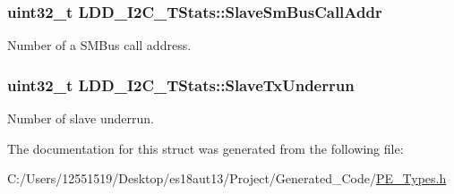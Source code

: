 \subsubsection[{Slave\+Sm\+Bus\+Call\+Addr}]{\setlength{\rightskip}{0pt plus 5cm}uint32\+\_\+t L\+D\+D\+\_\+\+I2\+C\+\_\+\+T\+Stats\+::\+Slave\+Sm\+Bus\+Call\+Addr}\label{struct_l_d_d___i2_c___t_stats_a134cb9fb9e37217e70e8a93924bca300}
Number of a S\+M\+Bus call address. \hypertarget{struct_l_d_d___i2_c___t_stats_add2f9914a1ea98c3bf86c0cab84e6a8c}{}
\subsubsection[{Slave\+Tx\+Underrun}]{\setlength{\rightskip}{0pt plus 5cm}uint32\+\_\+t L\+D\+D\+\_\+\+I2\+C\+\_\+\+T\+Stats\+::\+Slave\+Tx\+Underrun}\label{struct_l_d_d___i2_c___t_stats_add2f9914a1ea98c3bf86c0cab84e6a8c}
Number of slave underrun. 

The documentation for this struct was generated from the following file\+:\begin{DoxyCompactItemize}
\item 
C\+:/\+Users/12551519/\+Desktop/es18aut13/\+Project/\+Generated\+\_\+\+Code/\hyperlink{_p_e___types_8h}{P\+E\+\_\+\+Types.\+h}\end{DoxyCompactItemize}
